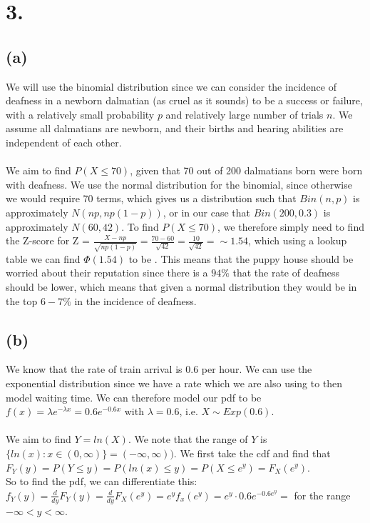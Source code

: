 \documentclass{article}
\begin{document}
\section*{3.}
{\Large

\subsection*{(a)}
We will use the binomial distribution since we can consider the incidence of deafness in a newborn dalmatian (as cruel as it sounds) to be a success or failure, with a relatively small probability $p$ and relatively large number of trials $n$. We assume all dalmatians are newborn, and their births and hearing abilities are independent of each other. \\ \\
We aim to find $P(X \leq 70)$, given that 70 out of 200 dalmatians born were born with deafness. We use the normal distribution for the binomial, since otherwise we would require 70 terms, which gives us a distribution such that $Bin(n,p)$ is approximately $N(np, np(1-p))$, or in our case that $Bin(200, 0.3)$ is approximately $N(60, 42)$. To find $P(X \leq 70)$, we therefore simply need to find the Z-score for Z = $\frac{X - np}{\sqrt{np(1-p)}} = \frac{70-60}{\sqrt{42}} = \frac{10}{\sqrt{42}} = \sim 1.54$, which using a lookup table we can find $\Phi(1.54)$ to be . This means that the puppy house should be worried about their reputation since there is a $94\%$ that the rate of deafness should be lower, which means that given a normal distribution they would be in the top $6-7\%$ in the incidence of deafness.

\subsection*{(b)}
We know that the rate of train arrival is 0.6 per hour. We can use the exponential distribution since we have a rate which we are also using to then model waiting time. We can therefore model our pdf to be $f(x) = \lambda e^{-\lambda x} = 0.6e^{-0.6x}$ with $\lambda = 0.6$, i.e. $X \sim Exp(0.6)$. \\ \\
We aim to find $Y = ln(X)$. We note that the range of $Y$ is $\{ln(x) : x \in (0, \infty)\} = (-\infty, \infty))$. We first take the cdf and find that \\
$F_Y(y) = P(Y \leq y) = P(ln(x) \leq y) = P(X \leq e^y) = F_X(e^y)$.
\\ So to find the pdf, we can differentiate this: \\
$f_Y(y) = \frac{d}{dy}F_Y(y) = \frac{d}{dy}F_X(e^y) = e^y f_x(e^y) = e^y \cdot 0.6e^{-0.6e^y} = $  for the range $-\infty < y <\infty$.

}
\end{document}
